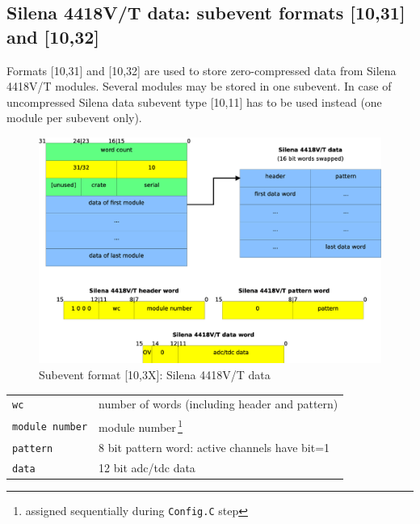 \documentclass[10pt]{article}
\begin{document}
\subsection{Silena 4418V/T data: subevent formats [10,31] and [10,32]}
Formats [10,31] and [10,32] are used to store zero-compressed data from Silena 4418V/T modules.
Several modules may be stored in one subevent. In case of uncompressed Silena data subevent type [10,11]
has to be used instead (one module per subevent only).
\begin{figure}[H]
\centerline{\includegraphics[width=\linewidth]{MedSevt_Silena}}
\caption{Subevent format [10,3X]: Silena 4418V/T data}
\label{MedSevt_Silena}
\end{figure}
\begin{minipage}{\linewidth}
\begin{table}[H]
\begin{center}
\begin{tabular}{ll}
\hline
\verb+wc+ & number of words (including header and pattern) \\
\verb+module number+ & module number\,\footnote{assigned sequentially during \texttt{Config.C} step} \\
\verb+pattern+ & 8 bit pattern word: active channels have bit=1 \\
\verb+data+ & 12 bit adc/tdc data \\
\hline
\end{tabular}
\end{center}
\label{MedSevt_Silena_Legend}
\end{table}
\end{minipage}
\newpage
\end{document}
